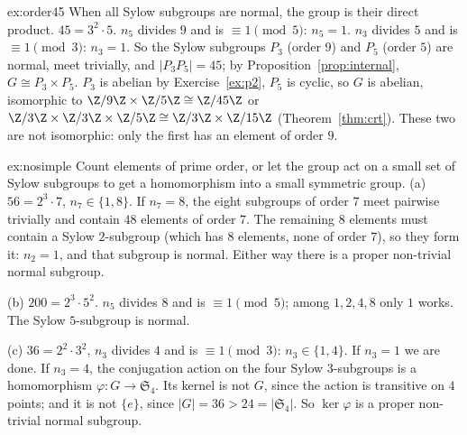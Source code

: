 \begin{solution}{ex:order45}
\idea When all Sylow subgroups are normal, the group is their direct product.
\writeup $45=3^2\cdot5$. $n_5$ divides $9$ and is $\equiv1\pmod5$: $n_5=1$. $n_3$ divides $5$ and is $\equiv1\pmod3$: $n_3=1$. So the Sylow subgroups $P_3$ (order $9$) and $P_5$ (order $5$) are normal, meet trivially, and $|P_3P_5|=45$; by Proposition~\ref{prop:internal}, $G\cong P_3\times P_5$. $P_3$ is abelian by Exercise~\ref{ex:p2}, $P_5$ is cyclic, so $G$ is abelian, isomorphic to $\Z/9\Z\times\Z/5\Z\cong\Z/45\Z$ or $\Z/3\Z\times\Z/3\Z\times\Z/5\Z\cong\Z/3\Z\times\Z/15\Z$ (Theorem~\ref{thm:crt}). These two are not isomorphic: only the first has an element of order $9$.
\end{solution}

\begin{solution}{ex:nosimple}
\idea Count elements of prime order, or let the group act on a small set of Sylow subgroups to get a homomorphism into a small symmetric group.
\writeup (a) $56=2^3\cdot7$, $n_7\in\{1,8\}$. If $n_7=8$, the eight subgroups of order $7$ meet pairwise trivially and contain $48$ elements of order $7$. The remaining $8$ elements must contain a Sylow $2$-subgroup (which has $8$ elements, none of order $7$), so they form it: $n_2=1$, and that subgroup is normal. Either way there is a proper non-trivial normal subgroup.

(b) $200=2^3\cdot5^2$. $n_5$ divides $8$ and is $\equiv1\pmod5$; among $1,2,4,8$ only $1$ works. The Sylow $5$-subgroup is normal.

(c) $36=2^2\cdot3^2$, $n_3$ divides $4$ and is $\equiv1\pmod3$: $n_3\in\{1,4\}$. If $n_3=1$ we are done. If $n_3=4$, the conjugation action on the four Sylow $3$-subgroups is a homomorphism $\varphi:G\to\mathfrak S_4$. Its kernel is not $G$, since the action is transitive on $4$ points; and it is not $\{e\}$, since $|G|=36>24=|\mathfrak S_4|$. So $\ker\varphi$ is a proper non-trivial normal subgroup.
\end{solution}

